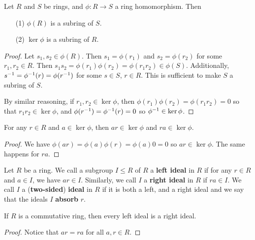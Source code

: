 \begin{lemma}\label{1.3.1}
    Let $R$ and $S$ be rings, and $\phi:R \xrightarrow{} S$ a ring homomorphism.
    Then
    \begin{enumerate}
        \item[(1)] $\phi(R)$ is a subring of $S$.

        \item[(2)] $\ker{\phi}$ is a subring of $R$.
    \end{enumerate}
\end{lemma}
\begin{proof}
    Let $s_1,s_2 \in \phi(R)$. Then $s_1=\phi(r_1)$ and $s_2=\phi(r_2)$ for some
    $r_1,r_2 \in R$. Then $s_1s_2=\phi(r_1)\phi(r_2)=\phi(r_1r_2) \in \phi(S)$.
    Additionally, $s^{-1}=\phi^{-1}(r)=\phi(r^{-1})$ for some $s \in S$,  $r
    \in R$. This is sufficient to make  $S$ a subring of  $S$.

    By similar reasoning, if $r_1,r_2 \in \ker{\phi}$, then
    $\phi(r_1)\phi(r_2)=\phi(r_1r_2)=0$ so that $r_1r_2 \in \ker{\phi}$, and
    $\phi(r^{-1})=\phi^{-1}(r)=0$ so $\phi^{-1}\in \ker{\phi}$.
\end{proof}
\begin{corollary}
    For any $r \in R$ and  $a \in \ker{\phi}$, then $ar \in \ker{\phi}$ and $ra
    \in \ker{\phi}$.
\end{corollary}
\begin{proof}
    We have $\phi(ar)=\phi(a)\phi(r)=\phi(a)0=0$ so $ar \in \ker{\phi}$. The
    same happens for $ra$.
\end{proof}

\begin{definition}
    Let $R$ be a ring. We call a subgroup $I \leq R$ of $R$ a \textbf{left
    ideal} in $R$ if for any $r \in R$ and $a \in I$, we have  $ar \in I$.
    Similarly, we call  $I$ a  \textbf{right ideal} in $R$ if  $ra \in I$. We
    call  $I$ a  (\textbf{two-sided}) \textbf{ideal} in $R$ if it is both a
    left, and a right ideal and we say that the ideals $I$ \textbf{absorb} $r$.
\end{definition}

\begin{lemma}\label{1.3.2}
    If $R$ is a commutative ring, then every left ideal is a right ideal.
\end{lemma}
\begin{proof}
    Notice that $ar=ra$ for all  $a,r \in R$.
\end{proof}

